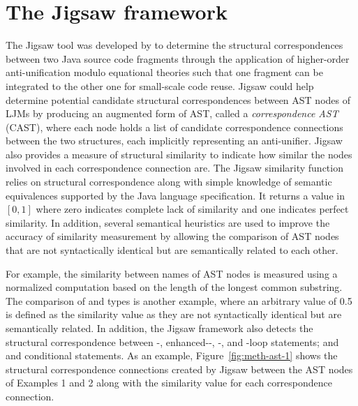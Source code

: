\section{The Jigsaw framework}\label{Jigsaw}
The Jigsaw tool was developed by \citet{2008:fse:cottrell} to determine the structural correspondences between two Java source code fragments through the application of higher-order anti-unification modulo equational theories such that one fragment can be integrated to the other one for small-scale code reuse. Jigsaw could help determine potential candidate structural correspondences between AST nodes of LJMs by producing an augmented form of AST, called a \emph{correspondence AST} (CAST), where each node holds a list of candidate correspondence connections between the two structures, each implicitly representing an anti-unifier. Jigsaw also provides a measure of structural similarity to indicate how similar the nodes involved in each correspondence connection are. The Jigsaw similarity function relies on structural correspondence along with simple knowledge of semantic equivalences supported by the Java language specification. It returns a value in $[0, 1]$ where zero indicates complete lack of similarity and one indicates perfect similarity. In addition, several semantical heuristics are used to improve the accuracy of similarity measurement by allowing the comparison of AST nodes that are not syntactically identical but are semantically related to each other.

For example, the similarity between names of AST nodes is measured using a normalized computation based on the length of the longest common substring. The comparison of  and  types is another example, where an arbitrary value of 0.5 is defined as the similarity value as they are not syntactically identical but are semantically related. In addition, the Jigsaw framework also detects the structural correspondence between  -, enhanced--, -, and -loop statements; and  and  conditional statements. As an example, Figure~\ref{fig:meth-ast-1} shows the structural correspondence connections created by Jigsaw between the AST nodes of Examples 1 and 2 along with the similarity value for each correspondence connection.


